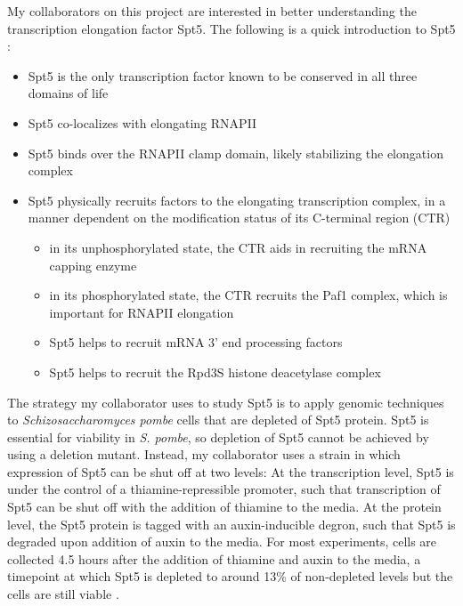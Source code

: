 \documentclass[9pt, letterpaper]{article}
\begin{document}
My collaborators on this project are interested in better understanding the transcription elongation factor Spt5. The following is a quick introduction to Spt5 \cite{shetty2017}:

\begin{itemize}[nosep, topsep=.5em]
    \item Spt5 is the only transcription factor known to be conserved in all three domains of life \cite{hartzog2013, werner2012}
    \item Spt5 co-localizes with elongating RNAPII \cite{mayer2010, rahl2010}
    \item Spt5 binds over the RNAPII clamp domain, likely stabilizing the elongation complex \cite{hirtreiter2010, klein2011, martinez-rucobo2011}
    \item Spt5 physically recruits factors to the elongating transcription complex, in a manner dependent on the modification status of its C-terminal region (CTR) \cite{hartzog2013}
    \begin{itemize}[nosep]
        \item in its unphosphorylated state, the CTR aids in recruiting the mRNA capping enzyme \cite{doamekpor2014, doamekpor2015, schneider2010, wen1999}
        \item in its phosphorylated state, the CTR recruits the Paf1 complex, which is important for RNAPII elongation \cite{liu2009, mbogning2013, wier2013, zhou2009}
        \item Spt5 helps to recruit mRNA 3' end processing factors \cite{mayer2012, stadelmayer2014, yamamoto2014}
        \item Spt5 helps to recruit the Rpd3S histone deacetylase complex \cite{drouin2010}
    \end{itemize}
\end{itemize}

The strategy my collaborator uses to study Spt5 is to apply genomic techniques to \textit{Schizosaccharomyces pombe} cells that are depleted of Spt5 protein. Spt5 is essential for viability in \textit{S. pombe}, so depletion of Spt5 cannot be achieved by using a deletion mutant. Instead, my collaborator uses a strain in which expression of Spt5 can be shut off at two levels: At the transcription level, Spt5 is under the control of a thiamine-repressible promoter, such that transcription of Spt5 can be shut off with the addition of thiamine to the media. At the protein level, the Spt5 protein is tagged with an auxin-inducible degron, such that Spt5 is degraded upon addition of auxin to the media. For most experiments, cells are collected 4.5 hours after the addition of thiamine and auxin to the media, a timepoint at which Spt5 is depleted to around 13\% of non-depleted levels but the cells are still viable \cite{shetty2017}.
\end{document}
